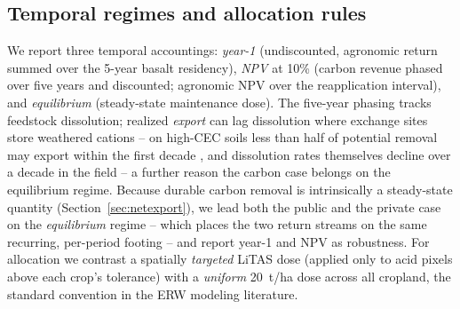 \documentclass[12pt]{article}
\begin{document}
\subsection{Temporal regimes and allocation rules}
We report three temporal accountings: \emph{year-1} (undiscounted, agronomic
return summed over the 5-year basalt residency), \emph{NPV} at 10\% (carbon
revenue phased over five years and discounted; agronomic NPV over the
reapplication interval), and \emph{equilibrium} (steady-state maintenance dose).
The five-year phasing tracks feedstock dissolution; realized \emph{export} can
lag dissolution where exchange sites store weathered cations -- on high-CEC
soils less than half of potential removal may export within the first decade
\citep{kanzaki2025}, and dissolution rates themselves decline over a decade in
the field \citep{brantley2025} -- a further reason the carbon case belongs on
the equilibrium regime.
Because durable carbon removal is intrinsically a steady-state quantity
(Section~\ref{sec:netexport}), we lead both the public and the private case on
the \emph{equilibrium} regime -- which places the two return streams on the same
recurring, per-period footing -- and report year-1 and NPV as robustness. For
allocation we contrast a spatially
\emph{targeted} LiTAS dose (applied only to acid pixels above each crop's
tolerance) with a \emph{uniform} 20~t/ha dose across all cropland, the standard
convention in the ERW modeling literature.
\end{document}

